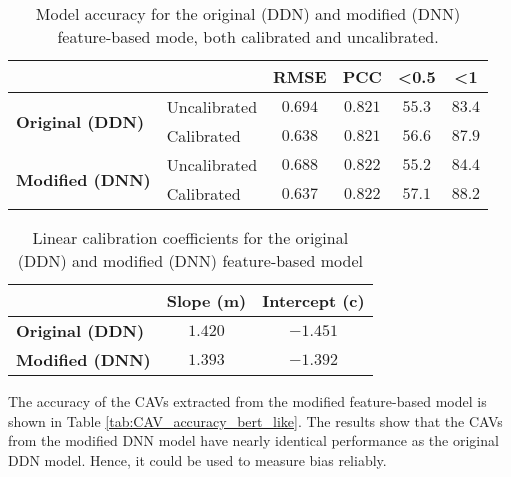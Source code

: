 \begin{table}[H]
    \centering
    \begin{tabular}{|l|l|c|c|c|c|}
        \hline
        \multicolumn{2}{|l|}{\textbf{}} & \textbf{RMSE} & \textbf{PCC} & \textbf{\textless 0.5} & \textbf{\textless 1}          \\ \hline
        \multirow{2}{*}{\textbf{Original (DDN)}}
                                        & Uncalibrated  & $0.694$      & $0.821$                & $55.3$               & $83.4$ \\ \cline{2-6}
                                        & Calibrated    & $0.638$      & $0.821$                & $56.6$               & $87.9$ \\ \hline
        \multirow{2}{*}{\textbf{Modified (DNN)}}
                                        & Uncalibrated  & $0.688$      & $0.822$                & $55.2$               & $84.4$ \\ \cline{2-6}
                                        & Calibrated    & $0.637$      & $0.822$                & $57.1$               & $88.2$ \\ \hline
    \end{tabular}
    \caption{Model accuracy for the original (DDN) and modified (DNN) feature-based mode, both calibrated and uncalibrated.}
    \label{tab:model_accuracy_dnn_like}
\end{table}


\begin{table}[H]
    \centering
    \begin{tabular}{|l|c|c|}
        \hline
        \textbf{}               & \textbf{Slope (m)} & \textbf{Intercept (c)} \\ \hline
        \textbf{Original (DDN)} & $1.420$            & $-1.451$               \\ \hline
        \textbf{Modified (DNN)} & $1.393$            & $-1.392$               \\ \hline
    \end{tabular}
    \caption{Linear calibration coefficients for the original (DDN) and modified (DNN) feature-based model}
    \label{tab:linear_regression_coefficients_dnn_like}
\end{table}

The accuracy of the CAVs extracted from the modified feature-based model is shown in Table \ref{tab:CAV_accuracy_bert_like}. The results show that the CAVs from the modified DNN model have nearly identical performance as the original DDN model. Hence, it could be used to measure bias reliably.

